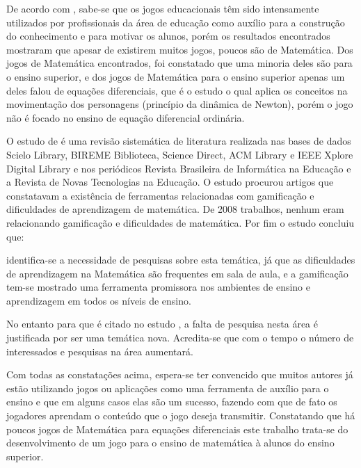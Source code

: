 De acordo com \cite{nunesParreira}, sabe-se que os jogos educacionais têm sido intensamente utilizados por profissionais da área de educação como auxílio para a construção do conhecimento e para motivar os alunos, porém os resultados encontrados mostraram que apesar de existirem muitos jogos, poucos são de Matemática. Dos jogos de Matemática encontrados, foi constatado que uma minoria deles são para o ensino superior, e dos jogos de Matemática para o ensino superior apenas um deles falou de equações diferenciais, que é o estudo \cite{videoGameED} o qual aplica os conceitos na movimentação dos personagens (princípio da dinâmica de Newton), porém o jogo não é focado no ensino de equação diferencial ordinária.

O estudo de \cite{revbibmatgam} é uma revisão sistemática de literatura realizada nas bases de dados Scielo Library, BIREME Biblioteca, Science Direct, ACM Library e IEEE Xplore Digital Library e nos periódicos Revista Brasileira de Informática na Educação e a Revista de Novas Tecnologias na Educação. O estudo procurou artigos que constatavam a existência de ferramentas relacionadas com gamificação e dificuldades de aprendizagem de matemática. De 2008 trabalhos, nenhum eram relacionando gamificação e dificuldades de matemática. Por fim o estudo concluiu que:

\begin{citacao}
identifica-se a necessidade de pesquisas sobre esta temática, já que as dificuldades de aprendizagem na Matemática são frequentes em sala de aula, e a gamificação tem-se mostrado uma ferramenta promissora nos ambientes de ensino e aprendizagem em todos os níveis de ensino. 
\end{citacao}

No entanto para \cite{dicheva} que é citado no estudo \cite{revbibmatgam}, a falta de pesquisa nesta área é justificada por ser uma temática nova. Acredita-se que com o tempo o número de interessados e pesquisas na área aumentará.

Com todas as constatações acima, espera-se ter convencido que muitos autores já estão utilizando jogos ou aplicações como uma ferramenta de auxílio para o ensino e que em alguns casos elas são um sucesso, fazendo com que de fato os jogadores aprendam o conteúdo que o jogo deseja transmitir. Constatando que há poucos jogos de Matemática para equações diferenciais este trabalho trata-se do desenvolvimento de um jogo para o ensino de matemática à alunos do ensino superior.
